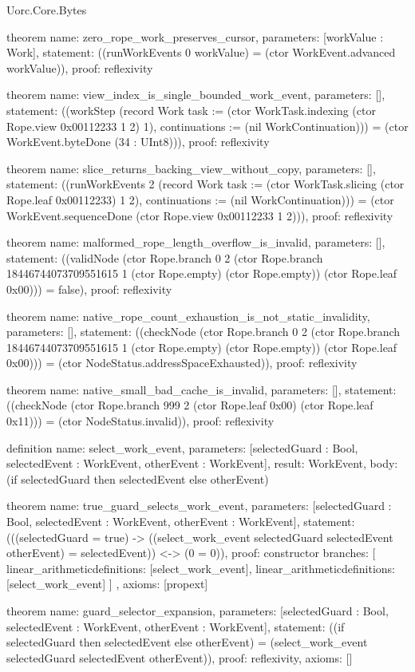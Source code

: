 \begin{lexlean}{Uorc.Core.Bytes}
\begin{semanticmodule}
theorem{
  name: zero_rope_work_preserves_cursor,
  parameters: [workValue : Work],
  statement: ((runWorkEvents 0 workValue) = (ctor WorkEvent.advanced workValue)),
  proof: reflexivity{}
}

theorem{
  name: view_index_is_single_bounded_work_event,
  parameters: [],
  statement: ((workStep (record Work {task := (ctor WorkTask.indexing (ctor Rope.view 0x00112233 1 2) 1), continuations := (nil WorkContinuation)})) = (ctor WorkEvent.byteDone (34 : UInt8))),
  proof: reflexivity{}
}

theorem{
  name: slice_returns_backing_view_without_copy,
  parameters: [],
  statement: ((runWorkEvents 2 (record Work {task := (ctor WorkTask.slicing (ctor Rope.leaf 0x00112233) 1 2), continuations := (nil WorkContinuation)})) = (ctor WorkEvent.sequenceDone (ctor Rope.view 0x00112233 1 2))),
  proof: reflexivity{}
}

theorem{
  name: malformed_rope_length_overflow_is_invalid,
  parameters: [],
  statement: ((validNode (ctor Rope.branch 0 2 (ctor Rope.branch 18446744073709551615 1 (ctor Rope.empty) (ctor Rope.empty)) (ctor Rope.leaf 0x00))) = false),
  proof: reflexivity{}
}

theorem{
  name: native_rope_count_exhaustion_is_not_static_invalidity,
  parameters: [],
  statement: ((checkNode (ctor Rope.branch 0 2 (ctor Rope.branch 18446744073709551615 1 (ctor Rope.empty) (ctor Rope.empty)) (ctor Rope.leaf 0x00))) = (ctor NodeStatus.addressSpaceExhausted)),
  proof: reflexivity{}
}

theorem{
  name: native_small_bad_cache_is_invalid,
  parameters: [],
  statement: ((checkNode (ctor Rope.branch 999 2 (ctor Rope.leaf 0x00) (ctor Rope.leaf 0x11))) = (ctor NodeStatus.invalid)),
  proof: reflexivity{}
}

definition{
  name: select_work_event,
  parameters: [selectedGuard : Bool, selectedEvent : WorkEvent, otherEvent : WorkEvent],
  result: WorkEvent,
  body: (if selectedGuard then selectedEvent else otherEvent)
}

theorem{
  name: true_guard_selects_work_event,
  parameters: [selectedGuard : Bool, selectedEvent : WorkEvent, otherEvent : WorkEvent],
  statement: (((selectedGuard = true) -> ((select_work_event selectedGuard selectedEvent otherEvent) = selectedEvent)) <-> (0 = 0)),
  proof: constructor{
    branches: [
      linear_arithmetic{definitions: [select_work_event]},
      linear_arithmetic{definitions: [select_work_event]}
    ]
  },
  axioms: [propext]
}

theorem{
  name: guard_selector_expansion,
  parameters: [selectedGuard : Bool, selectedEvent : WorkEvent, otherEvent : WorkEvent],
  statement: ((if selectedGuard then selectedEvent else otherEvent) = (select_work_event selectedGuard selectedEvent otherEvent)),
  proof: reflexivity{},
  axioms: []
}


\end{semanticmodule}
\end{lexlean}
